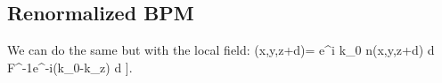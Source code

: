 \subsection{Renormalized BPM}

We can do the same but with the local field:
\be {}(x,y,z+d)= e^{i k_0 n(x,y,z+d) d } {\cal F}^{-1}\left[ {\cal
    F} [\ve{E}(x,y,z)] e^{-i(k_0-k_z) d} \right]. \ee
